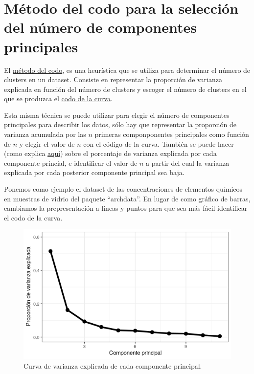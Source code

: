 \documentclass[12pt]{article}
\begin{document}
\section{Método del codo para la selección del número de componentes
  principales}

El
\href{https://en.wikipedia.org/wiki/Elbow_method_(clustering)}{método
  del codo}, es una heurística que se utiliza para determinar el
número de clusters en un dataset. Consiste en representar la
proporción de varianza explicada en función del número de clusters y
escoger el número de clusters en el que se produzca el
\href{https://en.wikipedia.org/wiki/Knee_of_a_curve}{codo de la
  curva}.

Esta misma técnica se puede utilizar para elegir el número de
componentes principales para describir los datos, sólo hay que
representar la proporción de varianza acumulada por las $n$ primeras
componponentes principales como función de $n$ y elegir el valor de
$n$ con el código de la curva. También se puede hacer (como explica
\href{https://feliperego.github.io/blog/2016/05/31/Intro-To-Principal-Component-Analysis}{aquí})
sobre el porcentaje de varianza explicada por cada componente
princial, e identificar el valor de $n$ a partir del cual la varianza
explicada por cada posterior componente principal sea baja.

Ponemos como ejemplo el dataset de las concentraciones de elementos
químicos en muestras de vidrio del paquete ``archdata''. En lugar de
como gráfico de barras, cambiamos la prepresentación a líneas y puntos
para que sea más fácil identificar el codo de la curva.

\begin{figure}[H]
  \centering
  \includegraphics[width=120mm]{elbow}
  \caption{Curva de varianza explicada de cada componente principal.}
\end{figure}
\end{document}
